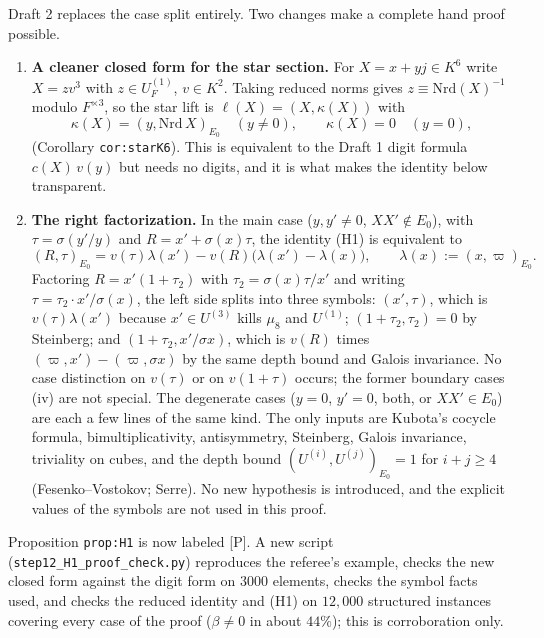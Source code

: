\documentclass[11pt]{article}
\begin{document}
Draft 2 replaces the case split entirely.  Two changes make a complete
hand proof possible.
\begin{enumerate}[leftmargin=*]
\item \textbf{A cleaner closed form for the star section.}  For
$X=x+yj\in K^6$ write $X=zv^3$ with $z\in U_F^{(1)}$, $v\in K^2$.  Taking
reduced norms gives $z\equiv\mathrm{Nrd}(X)^{-1}$ modulo $F^{\times3}$, so
the star lift is $\ell(X)=(X,\kappa(X))$ with
\[
 \kappa(X)=(y,\mathrm{Nrd}\,X)_{E_0}\quad(y\neq0),\qquad \kappa(X)=0\quad(y=0),
\]
(Corollary \texttt{cor:starK6}).  This is equivalent to the Draft 1 digit
formula $c(X)\,v(y)$ but needs no digits, and it is what makes the
identity below transparent.
\item \textbf{The right factorization.}  In the main case
($y,y'\neq0$, $XX'\notin E_0$), with $\tau=\sigma(y'/y)$ and
$R=x'+\sigma(x)\tau$, the identity (H1) is equivalent to
\[
 (R,\tau)_{E_0}=v(\tau)\lambda(x')-v(R)\bigl(\lambda(x')-\lambda(x)\bigr),\qquad
 \lambda(x):=(x,\varpi)_{E_0}.
\]
Factoring $R=x'(1+\tau_2)$ with $\tau_2=\sigma(x)\tau/x'$ and writing
$\tau=\tau_2\cdot x'/\sigma(x)$, the left side splits into three
symbols: $(x',\tau)$, which is $v(\tau)\lambda(x')$ because $x'\in U^{(3)}$
kills $\mu_8$ and $U^{(1)}$; $(1+\tau_2,\tau_2)=0$ by Steinberg; and
$(1+\tau_2,x'/\sigma x)$, which is $v(R)$ times
$(\varpi,x')-(\varpi,\sigma x)$ by the same depth bound and Galois
invariance.  No case distinction on $v(\tau)$ or on $v(1+\tau)$ occurs;
the former boundary cases (iv) are not special.  The degenerate cases
($y=0$, $y'=0$, both, or $XX'\in E_0$) are each a few lines of the same
kind.  The only inputs are Kubota's cocycle formula, bimultiplicativity,
antisymmetry, Steinberg, Galois invariance, triviality on cubes, and the
depth bound $(U^{(i)},U^{(j)})_{E_0}=1$ for $i+j\geq4$ (Fesenko--Vostokov;
Serre).  No new hypothesis is introduced, and the explicit values of the
symbols are not used in this proof.
\end{enumerate}
Proposition \texttt{prop:H1} is now labeled [P].  A new script
(\texttt{step12\_H1\_proof\_check.py}) reproduces the referee's example,
checks the new closed form against the digit form on $3000$ elements,
checks the symbol facts used, and checks the reduced identity and (H1)
on $12{,}000$ structured instances covering every case of the proof
($\beta\neq0$ in about $44\%$); this is corroboration only.
\end{document}
